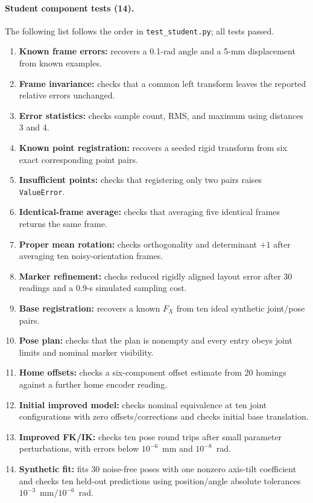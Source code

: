 \documentclass[11pt]{article}
\begin{document}
\paragraph{Student component tests (14).}
The following list follows the order in \texttt{test\_student.py}; all tests passed.
\begin{enumerate}
\setlength{\itemsep}{0pt}
\item \textbf{Known frame errors:} recovers a 0.1-rad angle and a 5-mm displacement from known examples.
\item \textbf{Frame invariance:} checks that a common left transform leaves the reported relative errors unchanged.
\item \textbf{Error statistics:} checks sample count, RMS, and maximum using distances 3 and 4.
\item \textbf{Known point registration:} recovers a seeded rigid transform from six exact corresponding point pairs.
\item \textbf{Insufficient points:} checks that registering only two pairs raises \texttt{ValueError}.
\item \textbf{Identical-frame average:} checks that averaging five identical frames returns the same frame.
\item \textbf{Proper mean rotation:} checks orthogonality and determinant $+1$ after averaging ten noisy-orientation frames.
\item \textbf{Marker refinement:} checks reduced rigidly aligned layout error after 30 readings and a 0.9-s simulated sampling cost.
\item \textbf{Base registration:} recovers a known $F_X$ from ten ideal synthetic joint/pose pairs.
\item \textbf{Pose plan:} checks that the plan is nonempty and every entry obeys joint limits and nominal marker visibility.
\item \textbf{Home offsets:} checks a six-component offset estimate from 20 homings against a further home encoder reading.
\item \textbf{Initial improved model:} checks nominal equivalence at ten joint configurations with zero offsets/corrections and checks initial base translation.
\item \textbf{Improved FK/IK:} checks ten pose round trips after small parameter perturbations, with errors below $10^{-6}$~mm and $10^{-8}$~rad.
\item \textbf{Synthetic fit:} fits 30 noise-free poses with one nonzero axis-tilt coefficient and checks ten held-out predictions using position/angle absolute tolerances $10^{-3}$~mm/$10^{-6}$~rad.
\end{enumerate}
\end{document}
